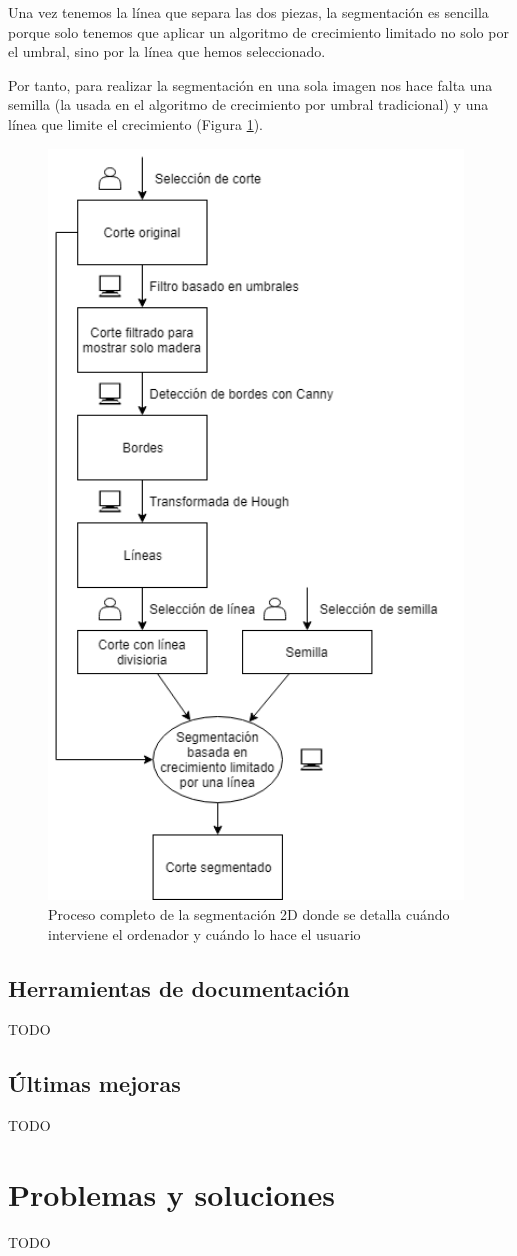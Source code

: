 Una vez tenemos la línea que separa las dos piezas, la segmentación es sencilla porque solo tenemos que aplicar un algoritmo de crecimiento limitado no solo por el umbral, sino por la línea que hemos seleccionado.

Por tanto, para realizar la segmentación en una sola imagen nos hace falta una semilla (la usada en el algoritmo de crecimiento por umbral tradicional) y una línea que limite el crecimiento (Figura \ref{fig:desarrollo/pipeline-segmentacion-2d}).

\begin{figure}[H]
	\centering
	\includegraphics[width=11cm]{imagenes/desarrollo/pipeline-segmentacion-2d}
	\caption{Proceso completo de la segmentación 2D donde se detalla cuándo interviene el ordenador y cuándo lo hace el usuario}
	\label{fig:desarrollo/pipeline-segmentacion-2d}
\end{figure}

\subsection{Herramientas de documentación}

TODO

\subsection{Últimas mejoras}

TODO

\section{Problemas y soluciones}

TODO